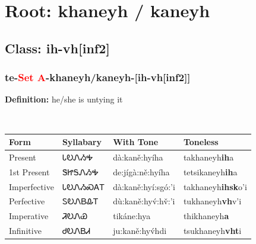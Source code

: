 \needspace{4in}
\section*{Root: khaneyh / kaneyh}
\nopagebreak
{}
\needspace{3in}
\subsection*{Class: ih-vh[inf2]}
\nopagebreak
\needspace{2in}
\subsubsection*{te{-}\textcolor{Red}{Set A}{-}\textbf{khaneyh/kaneyh}{-}[ih-vh[inf2]]}
\nopagebreak
\textbf{Definition: } he/she is untying it
\\[0.5em]
\begin{tabularx}{\textwidth}{l X X X}%
\toprule%
\textbf{Form}&\textbf{Syllabary}&\textbf{With Tone}&\textbf{Toneless}\\%
\midrule%
Present&ᏓᎧᏁᏱᎭ&dà:kaně:hyíha&takhaneyh\textbf{ih}a\\%
1st Present&ᏕᏥᎦᏁᏱᎭ&de:jígà:ně:hyíha&tetsikaneyh\textbf{ih}a\\%
Imperfective&ᏓᎧᏁᏱᏍᎪᎢ&dà:kaně:hyí:sgó:’i&takhaneyh\textbf{ihsk}o'i\\%
Perfective&ᏚᎧᏁᏴᎲᎢ&dù:kaně:hyv́:hv̌:’i&tukhaneyh\textbf{vh}v'i\\%
Imperative&ᏘᎧᏁᏯ&tikáne:hya&thikhaneyh\textbf{a}\\%
Infinitive&ᏧᎧᏁᏴᏗ&ju:kaně:hyv́hdi&tsukhaneyh\textbf{vht}i\\%
\bottomrule%
\end{tabularx}
\\[1em]